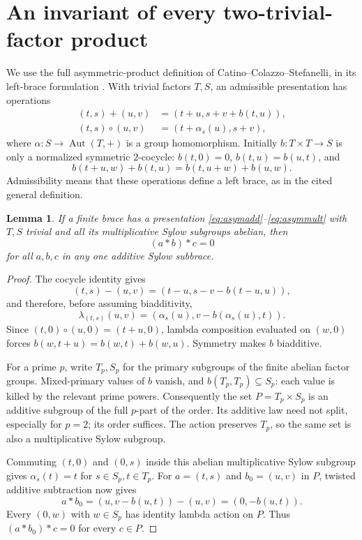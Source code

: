 \documentclass[11pt]{article}
\newtheorem{lemma}[theorem]{Lemma}
\begin{document}
\section{An invariant of every two-trivial-factor product}
We use the full asymmetric-product definition of
Catino--Colazzo--Stefanelli, in its left-brace formulation
\cite{CCS,BCJO,CJOembed}. With trivial factors $T,S$, an admissible
presentation has operations
\begin{align}
 (t,s)+(u,v)&=(t+u,s+v+b(t,u)),\label{eq:asymadd}\\
 (t,s)\circ(u,v)&=(t+\alpha_s(u),s+v),\label{eq:asymmult}
\end{align}
where $\alpha:S\to\operatorname{Aut}(T,+)$ is a group homomorphism.
Initially $b:T\times T\to S$ is only a normalized symmetric $2$-cocycle:
$b(t,0)=0$, $b(t,u)=b(u,t)$, and
\[
 b(t+u,w)+b(t,u)=b(t,u+w)+b(u,w).
\]
Admissibility means that these operations define a left brace, as in
the cited general definition.

\begin{lemma}\label{lem:obstruction}
If a finite brace has a presentation \eqref{eq:asymadd}--\eqref{eq:asymmult}
with $T,S$ trivial and all its multiplicative Sylow subgroups abelian,
then
\[
                     (a*b)*c=0
\]
for all $a,b,c$ in any one additive Sylow subbrace.
\end{lemma}
\begin{proof}
The cocycle identity gives
\[
 (t,s)-(u,v)=(t-u,s-v-b(t-u,u)),
\]
and therefore, before assuming biadditivity,
\[
 \lambda_{(t,s)}(u,v)=(\alpha_s(u),v-b(\alpha_s(u),t)).
\]
Since $(t,0)\circ(u,0)=(t+u,0)$, lambda composition evaluated on
$(w,0)$ forces $b(w,t+u)=b(w,t)+b(w,u)$. Symmetry makes $b$ biadditive.

For a prime $p$, write $T_p,S_p$ for the primary subgroups of the
finite abelian factor groups. Mixed-primary values of $b$ vanish, and
$b(T_p,T_p)\subseteq S_p$: each value is killed by the relevant prime
powers. Consequently the set $P=T_p\times S_p$ is an additive subgroup
of the full $p$-part of the order. Its additive law need not split,
especially for $p=2$; its order suffices. The action preserves $T_p$,
so the same set is also a multiplicative Sylow subgroup.

Commuting $(t,0)$ and $(0,s)$ inside this abelian multiplicative
Sylow subgroup gives $\alpha_s(t)=t$ for $s\in S_p,t\in T_p$.
For $a=(t,s)$ and $b_0=(u,v)$ in $P$, twisted additive subtraction
now gives
\[
 a*b_0=(u,v-b(u,t))-(u,v)=(0,-b(u,t)).
\]
Every $(0,w)$ with $w\in S_p$ has identity lambda action on $P$.
Thus $(a*b_0)*c=0$ for every $c\in P$.
\end{proof}
\end{document}

